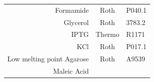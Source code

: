 \documentclass[11pt,singlespacinge,twoside]{reedthesis} %
\begin{document}
\begin{longtable}[]{@{}rcl@{}}
\begin{minipage}[t]{0.26\columnwidth}
Formamide\strut
\end{minipage} & \begin{minipage}[t]{0.50\columnwidth}\centering
Roth\strut
\end{minipage} & \begin{minipage}[t]{0.16\columnwidth}\raggedright
P040.1\strut
\end{minipage}\tabularnewline
\begin{minipage}[t]{0.26\columnwidth}\raggedleft
Glycerol\strut
\end{minipage} & \begin{minipage}[t]{0.50\columnwidth}\centering
Roth\strut
\end{minipage} & \begin{minipage}[t]{0.16\columnwidth}\raggedright
3783.2\strut
\end{minipage}\tabularnewline
\begin{minipage}[t]{0.26\columnwidth}\raggedleft
IPTG\strut
\end{minipage} & \begin{minipage}[t]{0.50\columnwidth}\centering
Thermo\strut
\end{minipage} & \begin{minipage}[t]{0.16\columnwidth}\raggedright
R1171\strut
\end{minipage}\tabularnewline
\begin{minipage}[t]{0.26\columnwidth}\raggedleft
KCl\strut
\end{minipage} & \begin{minipage}[t]{0.50\columnwidth}\centering
Roth\strut
\end{minipage} & \begin{minipage}[t]{0.16\columnwidth}\raggedright
P017.1\strut
\end{minipage}\tabularnewline
\begin{minipage}[t]{0.26\columnwidth}\raggedleft
Low melting point Agarose\strut
\end{minipage} & \begin{minipage}[t]{0.50\columnwidth}\centering
Roth\strut
\end{minipage} & \begin{minipage}[t]{0.16\columnwidth}\raggedright
A9539\strut
\end{minipage}\tabularnewline
\begin{minipage}[t]{0.26\columnwidth}\raggedleft
Maleic Acid\strut
\end{minipage} & \begin{minipage}[t]{0.50\columnwidth}\centering

\end{minipage}
\end{longtable}
\end{document}
